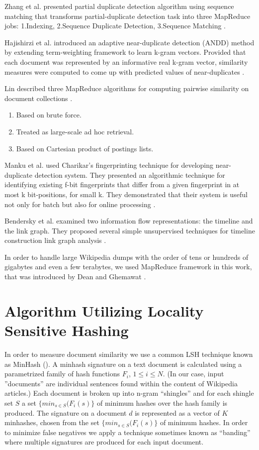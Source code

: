 \documentclass{acm_proc_article-sp}
\begin{document}
Zhang et al. presented partial duplicate detection algorithm using sequence matching that transforms partial-duplicate detection task into three MapReduce jobs: 1.Indexing, 2.Sequence Duplicate Detection, 3.Sequence Matching \cite{zhang:pdc}.

Hajishirzi et al. introduced an adaptive near-duplicate detection (ANDD) method by extending term-weighting framework to learn k-gram vectors. Provided that each document was represented by an informative real k-gram vector, similarity measures were computed to come up with predicted values of near-duplicates \cite{hajishirzi:andd}.

Lin described three MapReduce algorithms for computing pairwise similarity on document collections \cite{lin:brute}.
\begin{enumerate}
\item Based on brute force.
\item Treated as large-scale ad hoc retrieval.
\item Based on Cartesian product of postings lists.
\end{enumerate}

Manku et al. used Charikar's fingerprinting technique for developing near-duplicate detection system. They presented an algorithmic technique for identifying existing f-bit fingerprints that differ from a given fingerprint in at most k bit-positions, for small k. They demonstrated that their system is useful not only for batch but also for online processing \cite{manku:web}.

Bendersky et al. examined two information flow representations: the timeline and the link graph. They proposed several simple unsupervised techniques for timeline construction link graph analysis \cite{bendersky:timeline}.

In order to handle large Wikipedia dumps with the order of tens or hundreds of gigabytes and even a few terabytes, we used MapReduce framework in this work, that was introduced by Dean and Ghemawat \cite{dean:mapreduce}. 

\section{Algorithm Utilizing Locality \\ Sensitive Hashing}

In order to measure document similarity we use a common LSH technique known as MinHash (\cite{broder:resemblance}). A minhash signature on a text document is calculated using a parametrized family of hash functions $F_i$, $1 \le i \le N$. (In our case, input ''documents'' are individual sentences found within the content of Wikipedia articles.) Each document is broken up into n-gram ``shingles'' and for each shingle set $S$ a set $\{min_{s \in S}(F_i(s)\}$ of minimum hashes over the hash family is produced. The signature on a document $d$ is represented as a vector of $K$ minhashes, chosen from the set $\{min_{s \in S}(F_i(s)\}$ of minimum hashes. In order to minimize false negatives we apply a technique sometimes known as ``banding'' \cite{ullman:massive} where multiple signatures are produced for each input document.
\end{document}
